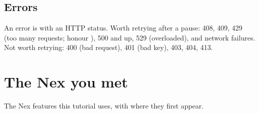 \section*{Errors}

An error is  with
an HTTP status. Worth retrying after a pause: 408, 409, 429 (too many
requests; honour ), 500 and up, 529 (overloaded), and
network failures. Not worth retrying: 400 (bad request), 401 (bad key),
403, 404, 413.

\chapter{The Nex you met}

The Nex features this tutorial uses, with where they first appear.


